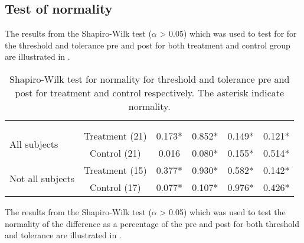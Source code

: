\subsection{Test of normality}
The results from the Shapiro-Wilk test ($\alpha$ > 0.05) which was used to test for for the threshold and tolerance pre and post for both treatment and control group are illustrated in .

\begin{longtable} {l|c|c|c|c|c}
\caption{Shapiro-Wilk test for normality for threshold and tolerance pre and post for treatment and control respectively. The asterisk indicate normality.}
	\label{tab:ShapiroWilk1} \\
\cellcolor[HTML]{C0C0C0} {} &  \cellcolor[HTML]{C0C0C0} {} &
\multicolumn{2}{c|}{ \cellcolor[HTML]{C0C0C0}{\textbf{Threshold}}} & \multicolumn{2}{c}{ \cellcolor[HTML]{C0C0C0}{\textbf{Tolerance}}}  	\\  \rule{0pt}{3ex} 
  \cellcolor[HTML]{C0C0C0}{} &   \cellcolor[HTML]{C0C0C0}{} &
 \multicolumn{1}{c|}{ \cellcolor[HTML]{C0C0C0}{Pre }} & \multicolumn{1}{c|}{ \cellcolor[HTML]{C0C0C0}{Post}} 
 & \multicolumn{1}{|c|}{ \cellcolor[HTML]{C0C0C0}{Pre}} 
 & \multicolumn{1}{c}{ \cellcolor[HTML]{C0C0C0}{Post}} 	\\ \hline 
\multirow{ 2}{*}{All subjects} & Treatment (21)& 0.173* & 0.852* & 0.149* & 0.121* \\
 & Control (21)& 0.016  & 0.080* & 0.155*  & 0.514* \\ \hline
\multirow{ 2}{*}{Not all subjects} & Treatment (15) & 0.377*  & 0.930* & 0.582* & 0.142* \\
& Control (17)& 0.077* & 0.107* & 0.976* & 0.426* \\ \hline
\end{longtable}
\vspace{-.5cm}

The results from the Shapiro-Wilk test ($\alpha$ > 0.05) which was used to test the normality of the difference as a percentage of the pre and post for both threshold and tolerance are illustrated in .


